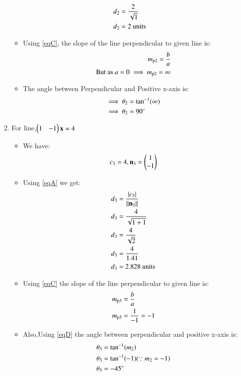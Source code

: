 \documentclass[journal,12pt,twocolumn]{IEEEtran}
\begin{document}
\begin{enumerate}
\begin{itemize}
\begin{align}
\\
d\textsubscript{2}&=\frac{2}{\sqrt{1}} 
\\
d\textsubscript{2}&=2 \text{ units}
\end{align}
\item Using \eqref{eqC}, the slope of the line perpendicular to given line is:
\begin{align}
  m\textsubscript{p2}=\frac{b}{a}
  \\
\text{But as } a=0 \implies m\textsubscript{p2}=\infty
\end{align}
\item The angle between Perpendicular and Positive x-axis is:
 \begin{align}
 \implies \theta\textsubscript{2} &= \tan^{-1}(\infty)
  \\
 \implies \theta\textsubscript{2} &= 90\degree
\end{align}
\end{itemize}
\item For line,$\begin{pmatrix}1&-1\end{pmatrix}\mathbf{x} =4$
\begin{itemize}
\item We have:
\begin{align}
 c\textsubscript{3}=4 ,{\mathbf{n\textsubscript{3}}}=\begin{pmatrix}1\\-1\end{pmatrix}   
\end{align}
\item Using \eqref{eqA} we get:
\begin{align}
d\textsubscript{3}&=\frac { \left| c\textsubscript{3}\right| }{\lVert\mathbf{n\textsubscript{3}}\rVert}
\\
d\textsubscript{3}&=\frac{4}{\sqrt{1+1}} 
\\
d\textsubscript{3}&=\frac{4}{\sqrt{2}}
\\
d\textsubscript{3}&=\frac{4}{1.41}
\\
d\textsubscript{3}&=2.828 \text{ units}
\end{align}
\item Using \eqref{eqC} the slope of the line perpendicular to given line is:
\begin{align}
  m\textsubscript{p3}&=\frac{b}{a}
  \\
  m\textsubscript{p3}&=\frac{1}{-1}=-1
\end{align}
 \item Also,Using \eqref{eqD} the angle between perpendicular and positive x-axis is:
 \begin{align}
  \theta\textsubscript{3} &= \tan^{-1}( m\textsubscript{2})
  \\
 \theta\textsubscript{3} &= \tan^{-1}(-1) (\because m\textsubscript{2}=-1)
 \\
 \theta\textsubscript{3} &= -45\degree
\end{align}
\end{itemize}


\end{enumerate}
\end{document}
